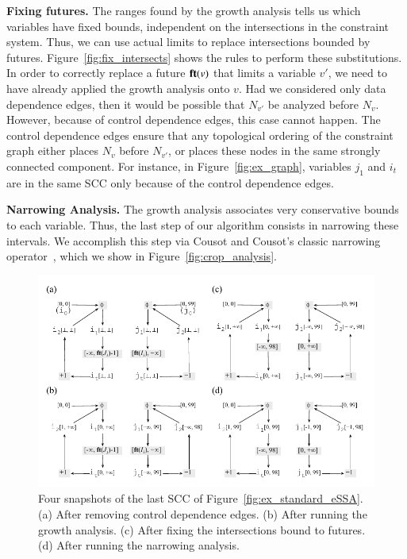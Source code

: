 \documentclass[preprint]{elsarticle}
\newcommand{\fun}[1]{\mbox{\textbf{#1}}}
\begin{document}
\noindent
\textbf{Fixing futures.}
The ranges found by the growth analysis tells us which variables have fixed
bounds, independent on the intersections in the constraint system.
Thus, we can use actual limits to replace intersections bounded by futures.
Figure~\ref{fig:fix_intersects} shows the rules to perform these substitutions.
In order to correctly replace a future $\fun{ft}(v)$ that limits a variable
$v'$, we need to have already applied the growth analysis onto $v$.
Had we considered only data dependence edges, then it would be possible
that $N_{v'}$ be analyzed before $N_v$.
However, because of control dependence edges, this case cannot happen.
The control dependence edges ensure that any topological ordering of the
constraint graph either places $N_v$ before $N_{v'}$, or places these nodes
in the same strongly connected component.
For instance, in Figure~\ref{fig:ex_graph}, variables $j_1$ and $i_t$ are in
the same SCC only because of the control dependence edges.

\noindent
\textbf{Narrowing Analysis.}
The growth analysis associates very conservative bounds to each variable.
Thus, the last step of our algorithm consists in narrowing these intervals.
We accomplish this step via Cousot and Cousot's classic narrowing
operator~\cite[p.248]{Cousot77}, which we show in
Figure~\ref{fig:crop_analysis}.

\begin{figure}[t!]
\begin{center}
\includegraphics[width=\textwidth]{images/ex_partition_grow_crop}
\end{center}
\caption{\label{fig:ex_partition_grow_crop}
Four snapshots of the last SCC of Figure~\ref{fig:ex_standard_eSSA}.
(a) After removing control dependence edges.
(b) After running the growth analysis.
(c) After fixing the intersections bound to futures.
(d) After running the narrowing analysis.}
\end{figure}
\end{document}
